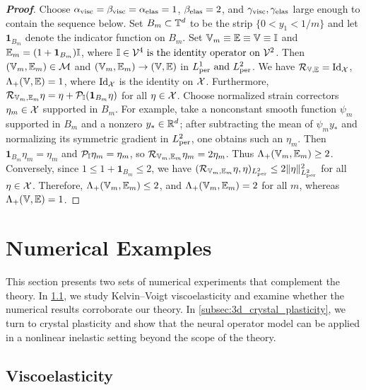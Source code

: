 \documentclass[3p, 12pt, preprint]{elsarticle}
\begin{document}
\begin{proof}[\bf Proof]
Choose $\alpha_{\rm visc}=\beta_{\rm visc}=\alpha_{\rm elas}=1$, $\beta_{\rm elas}=2$, and $\gamma_{\rm visc},\gamma_{\rm elas}$ large enough to contain the sequence below. Set $B_m\subset\mathbb{T}^d$ to be the strip $\{0<y_1<1/m\}$ and let $\mathbf{1}_{B_m}$ denote the indicator function on $B_m$. Set $\mathbb{V}_m\equiv \mathbb{E}\equiv \mathbb{V}\equiv \mathbb{I}$ and $\mathbb{E}_m=(1+\mathbf{1}_{B_m})\mathbb{I}$, where $\mathbb{I}\in{\mathcal{V}}^4\text{ is the identity operator on }{\mathcal{V}}^2$. Then $(\mathbb{V}_m,\mathbb{E}_m)\in{\mathcal{M}}$ and $(\mathbb{V}_m,\mathbb{E}_m)\to(\mathbb{V},\mathbb{E})$ in $L^1_{\rm per}\text{ and }L^2_{\rm per}$. We have ${\mathcal{R}}_{\mathbb{V},\mathbb{E}}=\mathrm{Id}_{{\mathcal{X}}}$, $\Lambda_+(\mathbb{V},\mathbb{E})=1$, where $\mathrm{Id}_{{\mathcal{X}}}$ is the identity on ${\mathcal{X}}$. Furthermore, ${\mathcal{R}}_{\mathbb{V}_m,\mathbb{E}_m}\eta=
\eta+{\mathcal{P}}_{\mathbb{I}}(\mathbf{1}_{B_m}\eta)$ for all $\eta\in{\mathcal{X}}$. Choose normalized strain correctors $\eta_m\in{\mathcal{X}}$ supported in $B_m$. For example, take a nonconstant smooth function $\psi_m$ supported in $B_m$ and a nonzero $y_*\in\mathbb{R}^d$; after subtracting the mean of $\psi_m y_*$ and normalizing its symmetric gradient in $L^2_{\rm per}$, one obtains such an $\eta_m$. Then $\mathbf{1}_{B_m}\eta_m=\eta_m$ and ${\mathcal{P}}_{\mathbb{I}}\eta_m=\eta_m$, so ${\mathcal{R}}_{\mathbb{V}_m,\mathbb{E}_m}\eta_m=2\eta_m$. Thus $\Lambda_+(\mathbb{V}_m,\mathbb{E}_m)\ge 2$. Conversely, since $1\le 1+\mathbf{1}_{B_m}\le 2$, we have $({\mathcal{R}}_{\mathbb{V}_m,\mathbb{E}_m}\eta,\eta)_{L^2_{\rm per}}\le 2\|\eta\|_{L^2_{\rm per}}^2$ for all $\eta\in{\mathcal{X}}$. Therefore, $\Lambda_+(\mathbb{V}_m,\mathbb{E}_m)\le 2$, and $\Lambda_+(\mathbb{V}_m,\mathbb{E}_m)=2$ for all $m$, whereas $\Lambda_+(\mathbb{V},\mathbb{E})=1$.
\end{proof}

\section{Numerical Examples}\label{sec:numerical_examples}

This section presents two sets of numerical experiments that complement the theory. In \cref{subsec:2d_viscoelasticity}, we study Kelvin--Voigt viscoelasticity and examine whether the numerical results corroborate our theory. In \cref{subsec:3d_crystal_plasticity}, we turn to crystal plasticity and show that the neural operator model can be applied in a nonlinear inelastic setting beyond the scope of the theory. 

\subsection{Viscoelasticity}\label{subsec:2d_viscoelasticity}
\end{document}
